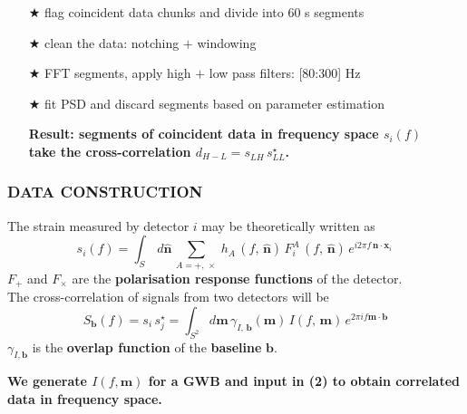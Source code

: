 \documentclass[handout]{beamer}
\begin{document}
\begin{frame}
\begin{itemize}
\small
    \item[$\bigstar$] flag coincident data chunks and divide into 60 s segments
    \item[$\bigstar$] clean the data: notching $+$ windowing
    \item[$\bigstar$] FFT segments, apply high $+$ low pass filters: [80:300] Hz
    \item[$\bigstar$] fit PSD and discard segments based on parameter estimation
    \begin{block}{}
\centering
\normalsize
\textcolor{textcol}{\bf Result: segments of coincident data in frequency space $s_i(f)$\\
take the cross-correlation $d_{H-L} = s_{LH}^{}\,s_{LL}^\star$.}
\end{block}
\end{itemize}

\end{frame}

\begin{frame}
	\frametitle{DATA CONSTRUCTION}
 The strain measured by detector $i$ may be theoretically written as
  \begin{equation}
s_{i}(f)=\int_S\, d\bm{\hat n}\,\sum_{A=+,\,\times}\,h^{}_A\,(f,\,\bm{\hat n})\,F_i^A\,(f,\,\bm{\hat n})\,e^{i2\pi f\,\bm{n\cdot x}_i}\,
\label{dectresp}
\end{equation}
 \flushleft
$F_+$ and $F_\times$ are the \textbf{polarisation response functions} of the detector.\\
\smallskip
\normalsize 
The cross-correlation of signals from two detectors will be
\begin{equation}
S_{\bm b}(f) = s_i\,s_j^{\star} = \int_{S^2} d\bm{m}\, \gamma_{I,\,\bm{b}}(\bm{m})\,I(f,\,\bm{m})\,e^{2\pi i f \bm{m}\cdot\bm{b}}
\end{equation}
$\gamma_{I, \bm{b}}$ is the \textbf{overlap function} of the \textbf{baseline} $\bm{b}$. \\
\begin{block}{}
\centering
\textcolor{textcol}{\bf We generate $I(f,\bm{m})$ for a GWB and input in (2) to obtain correlated data in frequency space.}
\end{block}
\end{frame}
\end{document}
